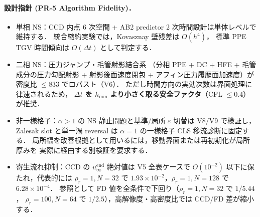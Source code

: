 \paragraph{設計指針 (PR-5 Algorithm Fidelity)．}
\begin{itemize}\setlength{\itemsep}{0pt}
  \item 単相 NS：CCD 内点 6 次空間 + AB2 predictor 2 次時間設計は単体レベルで維持する．
        統合縮約実験では，Kovasznay 壁残差は $O(h^4)$，
        標準 PPE TGV 時間傾向は $O(\Delta t)$ として判定する．
  \item 二相 NS：圧力ジャンプ・毛管射影結合系
        （分相 PPE + DC + HFE + 毛管成分の圧力勾配射影 + 射影後面速度閉包 + アフィン圧力履歴面加速度）が
        密度比 $\le 833$ でロバスト（V6）．
        ただし時間方向の実効次数は界面処理に律速されるため，
        \textbf{$\Delta t$ を $h_{\min}$ より小さく取る安全ファクタ}（CFL $\le 0.4$）が推奨．
  \item 非一様格子：$\alpha>1$ の NS 静止問題と基準/局所 $\varepsilon$ 切替は V8/V9 で検証し，
        Zalesak slot と単一渦 reversal は $\alpha=1$ の一様格子 CLS 移流診断に固定する．
        局所幅を改善根拠として用いるには，移動界面または再初期化が局所厚みを
        実際に経由する別検証を要求する．
  \item 寄生流れ抑制：CCD の $u_\infty^{\mathrm{end}}$ 絶対値は V5 全表ケースで
        $O(10^{-2})$ 以下に保たれ，代表的には
        $\rho_r=1,N=32$ で $1.93\!\times\!10^{-2}$，$\rho_r=1,N=128$ で $6.28\!\times\!10^{-4}$．
        参照として FD 値を全条件で下回り（$\rho_r=1,N=32$ で $1/5.44$，
        $\rho_r=100,N=64$ で $1/2.5$），高解像度・高密度比では CCD/FD 差が縮小する．
\end{itemize}

